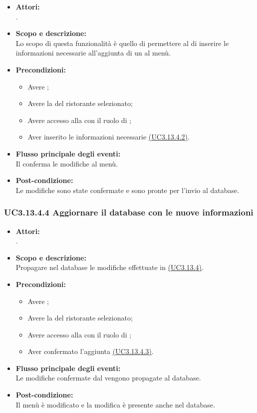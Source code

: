 \begin{itemize}
	\item \textbf{Attori:}
	\\.
	\item \textbf{Scopo e descrizione:} 
	\\Lo scopo di questa funzionalità è quello di permettere al  di inserire le informazioni necessarie all'aggiunta di un  al menù.
	\item \textbf{Precondizioni:}
	\begin{itemize}
		\item Avere ;
		\item Avere la  del ristorante selezionato;
		\item Avere accesso alla  con il ruolo di ;
		\item Aver inserito le informazioni necessarie \hyperref[UC3.13.4.2]{(UC3.13.4.2)}.
	\end{itemize}
	\item \textbf{Flusso principale degli eventi:}
	\\Il {} conferma le modifiche al menù.
	\item \textbf{Post-condizione:}
	\\Le modifiche sono state confermate e sono pronte per l'invio al database.
\end{itemize}

\subsubsection{UC3.13.4.4 Aggiornare il database con le nuove informazioni} \label{UC3.13.4.4}

\begin{itemize}
	\item \textbf{Attori:}
	\\.
	\item \textbf{Scopo e descrizione:} 
	\\Propagare nel database le modifiche effettuate in \hyperref[UC3.13.4]{(UC3.13.4)}.
	\item \textbf{Precondizioni:}
	\begin{itemize}
		\item Avere ;
		\item Avere la  del ristorante selezionato;
		\item Avere accesso alla  con il ruolo di ;
		\item Aver confermato l'aggiunta \hyperref[UC3.13.4.3]{(UC3.13.4.3)}.
	\end{itemize}
	\item \textbf{Flusso principale degli eventi:}
	\\Le modifiche confermate dal  vengono propagate al database.
	\item \textbf{Post-condizione:}
	\\Il menù è modificato e la modifica è presente anche nel database.
\end{itemize}

